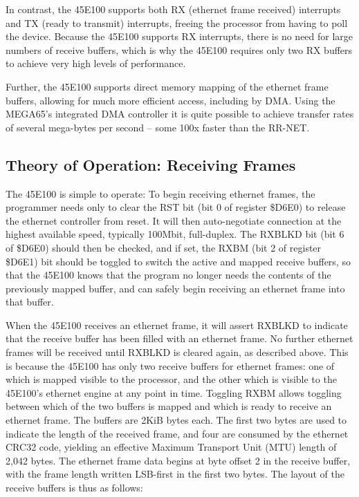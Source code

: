 In contrast, the 45E100 supports both RX (ethernet frame received) interrupts and TX
(ready to transmit) interrupts, freeing the processor from having to poll
the device. Because the 45E100 supports RX interrupts, there is no need for large
numbers of receive buffers, which is why the 45E100 requires only two RX buffers
to achieve very high levels of performance.

Further, the 45E100 supports direct memory mapping of the
ethernet frame buffers, allowing for much more efficient access, including
by DMA.  Using the MEGA65's integrated DMA controller it is quite possible
to achieve transfer rates of several mega-bytes per second -- some 100x
faster than the RR-NET.

\subsection{Theory of Operation: Receiving Frames}

The 45E100 is simple to operate: To begin receiving ethernet frames, the programmer
needs only to clear the RST bit (bit 0 of register \$D6E0) to release the
ethernet controller from reset.  It will then auto-negotiate connection at
the highest available speed, typically 100Mbit, full-duplex.  The RXBLKD bit (bit 6 of \$D6E0)
should then be checked, and if set, the RXBM (bit 2 of register \$D6E1) bit should be toggled to switch
the active and mapped receive buffers, so that the 45E100 knows that the
program no longer needs the contents of the previously mapped buffer, and can
safely begin receiving an ethernet frame into that buffer.

When the 45E100 receives an ethernet frame, it will assert RXBLKD to indicate that the receive
buffer has been filled with an ethernet frame.  No further ethernet frames will be received until
RXBLKD is cleared again, as described above. This is because the 45E100 has only two receive buffers
for ethernet frames: one of which is mapped visible to the processor, and the other which is visible
to the 45E100's ethernet engine at any point in time.  Toggling RXBM allows toggling between which
of the two buffers is mapped and which is ready to receive an ethernet frame.  The buffers are 2KiB
bytes each.  The first two bytes are used to indicate the length of the received frame, and four
are consumed by the ethernet CRC32 code, yielding an effective Maximum Transport Unit (MTU) length
of 2,042 bytes.  The ethernet frame data begins at byte offset 2 in the receive buffer, with the
frame length written LSB-first in the first two bytes.  The layout of the receive buffers is thus as follows:

